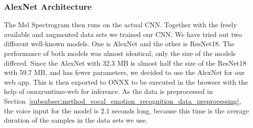 \subsubsection{AlexNet Architecture}
\label{subsubsec:method_vocal_emotion_recognition_alexnet_architecture}
The Mel Spectrogram then runs on the actual CNN. Together with the freely available and augmented data sets we trained our CNN. We have tried out two different well-known models. One is AlexNet and the other is ResNet18. The performance of both models was almost identical, only the size of the models differed. Since the AlexNet with 32.3 MB is almost half the size of the ResNet18 with 59.7 MB, and has fewer parameters, we decided to use the AlexNet for our web app. This is then exported to ONNX to be executed in the browser with the help of onnxruntime-web for inference. As the data is preprocessed in Section~\ref{subsubsec:method_vocal_emotion_recognition_data_preprocessing}, the voice input for the model is 2.1 seconds long, because this time is the average duration of the samples in the data sets we use.
